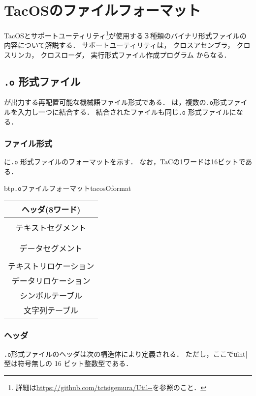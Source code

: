 \chapter{TacOSのファイルフォーマット}
\label{appTacosFileFormat}
TacOSと{\cmml}サポートユーティリティ\footnote{
  詳細は\url{https://github.com/tctsigemura/Util--}を参照のこと．
}が使用する３種類のバイナリ形式ファイルの内容について解説する．
{\cmml}サポートユーティリティは，
クロスアセンブラ{\as}，
クロスリンカ{\ld}，
クロスローダ{\objbin}，
実行形式ファイル作成プログラム{\objexe}
からなる．

\section{\texttt{.o} 形式ファイル}
{\as}が出力する再配置可能な機械語ファイル形式である．
{\ld}は，複数の\texttt{.o}形式ファイルを入力し一つに結合する．
結合されたファイルも同じ\texttt{.o} 形式ファイルになる．

\subsection{ファイル形式}
に\texttt{.o} 形式ファイルのフォーマットを示す．
なお，TaCの1ワードは16ビットである．

\begin{myfig}{btp}{\texttt{.o}ファイルフォーマット}{tacosOformat}
\begin{tabular}{|c|}\hline
ヘッダ(8ワード) \\\hline
\\
テキストセグメント \\
\\\hline
\\
データセグメント \\
\\\hline
テキストリロケーション \\\hline
データリロケーション \\\hline
シンボルテーブル \\\hline
文字列テーブル \\\hline
\end{tabular}
\end{myfig}

\subsection{ヘッダ}
\texttt{.o}形式ファイルのヘッダは次の構造体により定義される．
ただし，ここで\|uint|型は符号無しの 16 ビット整数型である．

